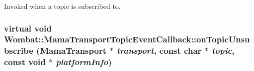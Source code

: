 Invoked when a topic is subscribed to. \hypertarget{classWombat_1_1MamaTransportTopicEventCallback_af6cca0f35e9380019e4c780dbd7d8a2b}{
\subsubsection[{onTopicUnsubscribe}]{\setlength{\rightskip}{0pt plus 5cm}virtual void Wombat::MamaTransportTopicEventCallback::onTopicUnsubscribe ({\bf MamaTransport} $\ast$ {\em transport}, \/  const char $\ast$ {\em topic}, \/  const void $\ast$ {\em platformInfo})}}
\label{classWombat_1_1MamaTransportTopicEventCallback_af6cca0f35e9380019e4c780dbd7d8a2b}
